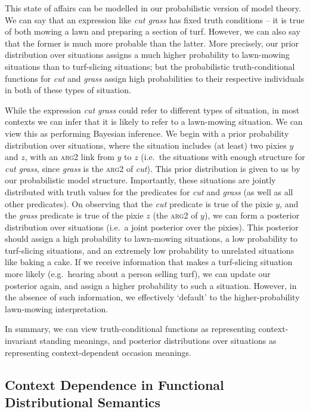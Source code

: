 \documentclass[a4paper,11pt]{article}
\begin{document}
This state of affairs can be modelled in our probabilistic version of model theory.
We can say that an expression like \textit{cut grass} has fixed truth conditions --
it is true of both mowing a lawn and preparing a section of turf.
However, we can also say that the former is much more probable than the latter.
More precisely, our prior distribution over situations assigns
a much higher probability to lawn-mowing situations
than to turf-slicing situations;
but the probabilistic truth-conditional functions for \textit{cut} and \textit{grass}
assign high probabilities to their respective individuals in both of these types of situation.

While the expression \textit{cut grass} could refer to different types of situation,
in most contexts we can infer that
it is likely to refer to a lawn-mowing situation.
We can view this as performing Bayesian inference.
We begin with a prior probability distribution over situations,
where the situation includes (at least) two pixies $y$ and $z$,
with an \textsc{arg2} link from $y$ to $z$
(i.e.\ the situations with enough structure for \textit{cut grass},
since \textit{grass} is the \textsc{arg2} of \textit{cut}).
This prior distribution is given to us by our probabilistic model structure.
Importantly, these situations are jointly distributed with
truth values for the predicates for \textit{cut} and \textit{grass} (as well as all other predicates).
On observing that the \textit{cut} predicate is true of the pixie $y$,
and the \textit{grass} predicate is true of the pixie $z$ (the \textsc{arg2} of $y$),
we can form a posterior distribution over situations
(i.e.\ a joint posterior over the pixies).
This posterior should assign a high probability to lawn-mowing situations,
a low probability to turf-slicing situations,
and an extremely low probability to unrelated situations like baking a cake.
If we receive information that makes a turf-slicing situation more likely
(e.g.\ hearing about a person selling turf),
we can update our posterior again, and assign a higher probability to such a situation.
However, in the absence of such information,
we effectively `default' to the higher-probability lawn-mowing interpretation.

In summary, we can view truth-conditional functions as
representing context-invariant standing meanings,
and posterior distributions over situations as
representing context-dependent occasion meanings.


\subsection{Context Dependence in Functional Distributional Semantics}
\label{sec:meanfield}
\end{document}
